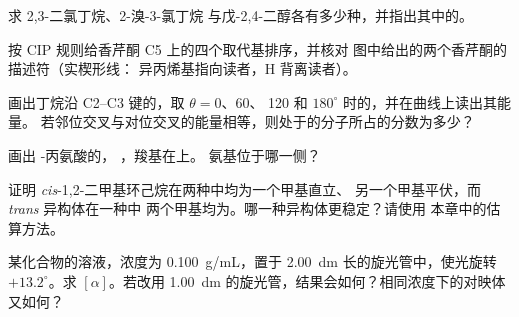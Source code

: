 \begin{exercise}[$\star$]\label{exo:b1:stereochemistry-in-depth:3}
求 2,3-二氯丁烷、2-溴-3-氯丁烷
与戊-2,4-二醇各有多少种，并指出其中的。
\end{exercise}

\begin{exercise}[$\star$]\label{exo:b1:stereochemistry-in-depth:4}
按 CIP 规则给香芹酮 C5 上的四个取代基排序，并核对
图中给出的两个香芹酮的描述符（实楔形线：
异丙烯基指向读者，H 背离读者）。
\end{exercise}

\begin{exercise}[$\star\star$]\label{exo:b1:stereochemistry-in-depth:5}
画出丁烷沿 C2--C3 键的，取 $\theta = 0$、60、
120 和 $180^\circ$ 时的，并在曲线上读出其能量。
若邻位交叉与对位交叉的能量相等，则处于的分子所占的分数为多少？
\end{exercise}

\begin{exercise}[$\star\star$]\label{exo:b1:stereochemistry-in-depth:6}
画出 -丙氨酸的，
，羧基在上。
氨基位于哪一侧？
\end{exercise}

\begin{exercise}[$\star\star$]\label{exo:b1:stereochemistry-in-depth:7}
证明 \textit{cis}-1,2-二甲基环己烷在两种中均为一个甲基直立、
另一个甲基平伏，而 \textit{trans} 异构体在一种中
两个甲基均为。哪一种异构体更稳定？请使用
本章中的估算方法。
\end{exercise}

\begin{exercise}[$\star\star$]\label{exo:b1:stereochemistry-in-depth:8}
某化合物的溶液，浓度为 \qty{0.100}{g/mL}，置于 \qty{2.00}{dm}
长的旋光管中，使光旋转 $+13.2^\circ$。求 $[\alpha]$。若改用
\qty{1.00}{dm} 的旋光管，结果会如何？相同浓度下的对映体又如何？
\end{exercise}

